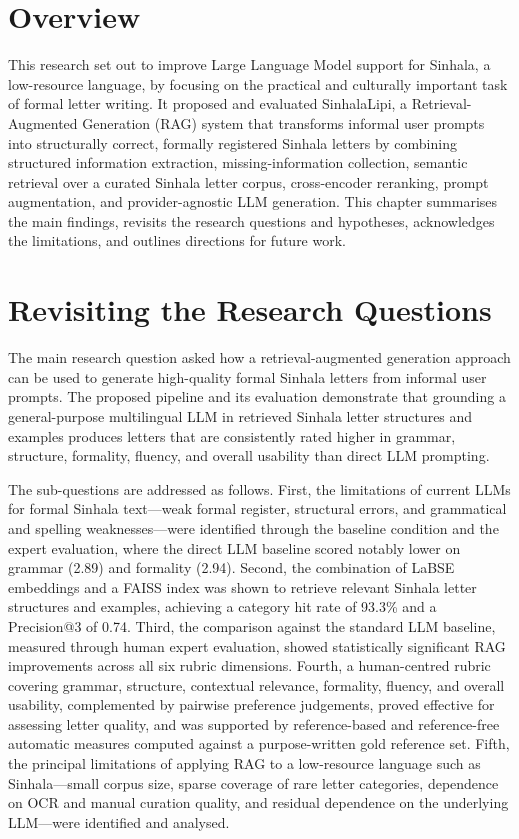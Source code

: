 \documentclass[12pt]{uomthesis}
\begin{document}
\section{Overview}
This research set out to improve Large Language Model support for Sinhala, a low-resource language, by focusing on the practical and culturally important task of formal letter writing. It proposed and evaluated SinhalaLipi, a Retrieval-Augmented Generation (RAG) system that transforms informal user prompts into structurally correct, formally registered Sinhala letters by combining structured information extraction, missing-information collection, semantic retrieval over a curated Sinhala letter corpus, cross-encoder reranking, prompt augmentation, and provider-agnostic LLM generation. This chapter summarises the main findings, revisits the research questions and hypotheses, acknowledges the limitations, and outlines directions for future work.

\section{Revisiting the Research Questions}
The main research question asked how a retrieval-augmented generation approach can be used to generate high-quality formal Sinhala letters from informal user prompts. The proposed pipeline and its evaluation demonstrate that grounding a general-purpose multilingual LLM in retrieved Sinhala letter structures and examples produces letters that are consistently rated higher in grammar, structure, formality, fluency, and overall usability than direct LLM prompting.

The sub-questions are addressed as follows. First, the limitations of current LLMs for formal Sinhala text—weak formal register, structural errors, and grammatical and spelling weaknesses—were identified through the baseline condition and the expert evaluation, where the direct LLM baseline scored notably lower on grammar (2.89) and formality (2.94). Second, the combination of LaBSE embeddings and a FAISS index was shown to retrieve relevant Sinhala letter structures and examples, achieving a category hit rate of 93.3\% and a Precision@3 of 0.74. Third, the comparison against the standard LLM baseline, measured through human expert evaluation, showed statistically significant RAG improvements across all six rubric dimensions. Fourth, a human-centred rubric covering grammar, structure, contextual relevance, formality, fluency, and overall usability, complemented by pairwise preference judgements, proved effective for assessing letter quality, and was supported by reference-based and reference-free automatic measures computed against a purpose-written gold reference set. Fifth, the principal limitations of applying RAG to a low-resource language such as Sinhala—small corpus size, sparse coverage of rare letter categories, dependence on OCR and manual curation quality, and residual dependence on the underlying LLM—were identified and analysed.
\end{document}
